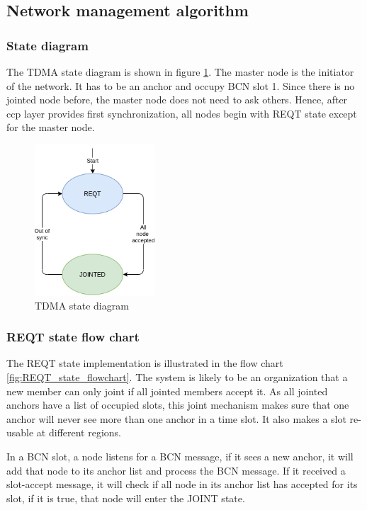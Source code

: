 \documentclass[\main/main.tex]{subfiles}
\begin{document}
\subsection{Network management algorithm}

\subsubsection{State diagram}
The TDMA state diagram is shown in figure \ref{fig:tdma_state_diagram}. 
The master node is the initiator of the network. It has to be an anchor and occupy BCN slot 1. Since there is no jointed node before, the master node does not need to ask others. Hence, after ccp layer provides first synchronization, all nodes begin with REQT state except for the master node. 

\begin{figure}[H]
    \begin{center}
        \includegraphics[width=0.4\textwidth]{tdma_state_diagram.png}
    \end{center}
    \caption{TDMA state diagram}
    \label{fig:tdma_state_diagram}
\end{figure}

\subsubsection{REQT state flow chart}
The REQT state implementation is illustrated in the flow chart \ref{fig:REQT_state_flowchart}. The system is likely to be an  organization that a new member can only joint if all jointed members accept it. As all jointed anchors have a list of occupied slots, this joint mechanism makes sure that one anchor will never see more than one anchor in a time slot. It also makes a slot re-usable at different regions.

In a BCN slot, a node listens for a BCN message, if it sees a new anchor, it will add that node to its anchor list and process the BCN message. If it received a slot-accept message, it will check if all node in its anchor list has accepted for its slot, if it is true, that node will enter the JOINT state.
\end{document}
